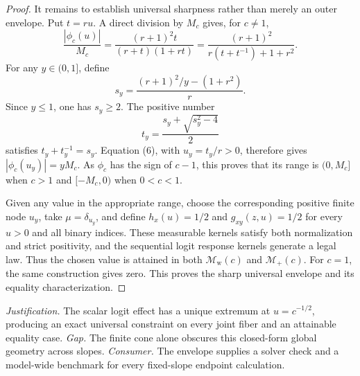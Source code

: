 \documentclass{article}
\begin{document}
\begin{proof}
It remains to establish universal sharpness rather than merely an outer envelope.  Put \(t=ru\).  A direct division by \(M_c\) gives, for \(c\ne1\),
\[
 \frac{|\phi_c(u)|}{M_c}
 =\frac{(r+1)^2t}{(r+t)(1+rt)}
 =\frac{(r+1)^2}{r(t+t^{-1})+1+r^2}. \tag{6}
\]
For any \(y\in(0,1]\), define
\[
 s_y=\frac{(r+1)^2/y-(1+r^2)}{r}.
\]
Since \(y\le1\), one has \(s_y\ge2\).  The positive number
\[
 t_y=\frac{s_y+\sqrt{s_y^2-4}}{2}
\]
satisfies \(t_y+t_y^{-1}=s_y\).  Equation (6), with \(u_y=t_y/r>0\), therefore gives \(|\phi_c(u_y)|=yM_c\).  As \(\phi_c\) has the sign of \(c-1\), this proves that its range is \((0,M_c]\) when \(c>1\) and \([-M_c,0)\) when \(0<c<1\).

Given any value in the appropriate range, choose the corresponding positive finite node \(u_y\), take \(\mu=\delta_{u_y}\), and define \(h_x(u)=1/2\) and \(g_{xy}(z,u)=1/2\) for every \(u>0\) and all binary indices.  These measurable kernels satisfy both normalization and strict positivity, and the sequential logit response kernels generate a legal law.  Thus the chosen value is attained in both \(\mathcal M_{\mathrm w}(c)\) and \(\mathcal M_+(c)\).  For \(c=1\), the same construction gives zero.  This proves the sharp universal envelope and its equality characterization.
\end{proof}
\par\smallskip\noindent \textit{Justification.} The scalar logit effect has a unique extremum at \(u=c^{-1/2}\), producing an exact universal constraint on every joint fiber and an attainable equality case. \textit{Gap.} The finite cone alone obscures this closed-form global geometry across slopes. \textit{Consumer.} The envelope supplies a solver check and a model-wide benchmark for every fixed-slope endpoint calculation.
\end{document}
